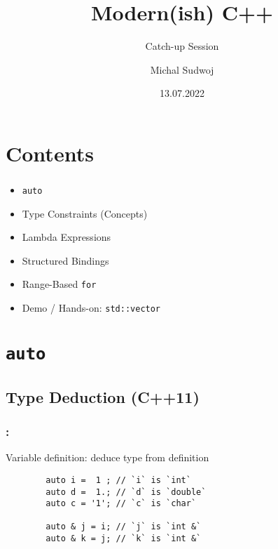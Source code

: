 \documentclass[aspectratio=43, t]{beamer}
\author{Michal Sudwoj}
\title{Modern(ish) C++}
\subtitle{Catch-up Session}
\date{13.07.2022}
\begin{document}
\renewcommand{\fcolorbox}[4][]{#4}

\makeatletter
{}
\beamer@calculateheadfoot
\makeatother

\begin{frame}[plain, c]
	\titlepage
\end{frame}

\section*{Contents}
\begin{frame}
	\frametitle{\secname}

	\begin{itemize}
		\item \texttt{auto}
		\item Type Constraints (Concepts)
		\item Lambda Expressions
		\item Structured Bindings
		\item Range-Based \texttt{for}
		\item Demo / Hands-on: \texttt{std::vector}
	\end{itemize}
\end{frame}

\section*{\texorpdfstring{\texttt{auto}}{auto}}
\subsection*{Type Deduction (C++11)}
\begin{frame}[fragile]
	\frametitle{\secname: \subsecname\footnotemark[1]{}}

	Variable definition: deduce type from definition
	\begin{verbatim}
		auto i =  1 ; // `i` is `int`
		auto d =  1.; // `d` is `double`
		auto c = '1'; // `c` is `char`

		auto & j = i; // `j` is `int &`
		auto & k = j; // `k` is `int &`
	\end{verbatim}
\end{frame}
\end{document}
